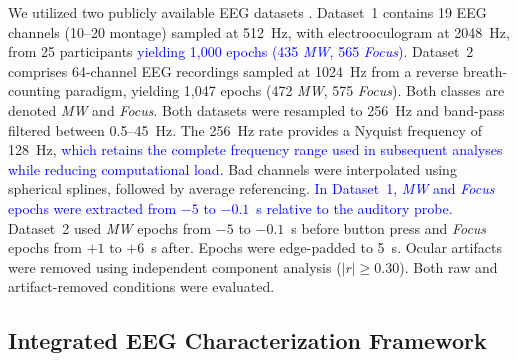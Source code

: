 \documentclass[conference]{IEEEtran}
\begin{document}
We utilized two publicly available EEG datasets \cite{rodlarios,grandchamp2014oculometric}. Dataset~1 \cite{rodlarios} contains 19 EEG channels (10--20 montage) sampled at 512~Hz, with electrooculogram at 2048~Hz, from 25 participants \textcolor{blue}{yielding 1,000 epochs (435 \textit{MW}, 565 \textit{Focus})}. Dataset~2 \cite{grandchamp2014oculometric} comprises 64-channel EEG recordings sampled at 1024~Hz from a reverse breath-counting paradigm, yielding 1,047 epochs (472 \textit{MW}, 575 \textit{Focus}). Both classes are denoted \textit{MW} and \textit{Focus}.
Both datasets were resampled to 256~Hz and band-pass filtered between 0.5--45~Hz. The 256~Hz rate provides a Nyquist frequency of 128~Hz, \textcolor{blue}{which retains the complete frequency range used in subsequent analyses while reducing computational load}. Bad channels were interpolated using spherical splines, followed by average referencing. \textcolor{blue}{In Dataset~1, \textit{MW} and \textit{Focus} epochs were extracted from $-5$ to $-0.1$~s relative to the auditory probe.} Dataset~2 used \textit{MW} epochs from $-5$ to $-0.1$~s before button press and \textit{Focus} epochs from $+1$ to $+6$~s after. Epochs were edge-padded to 5~s. Ocular artifacts were removed using independent component analysis \cite{delorme2004eeglab} ($|r|\geq0.30$). Both raw and artifact-removed conditions were evaluated.

\subsection{Integrated EEG Characterization Framework}
\end{document}
